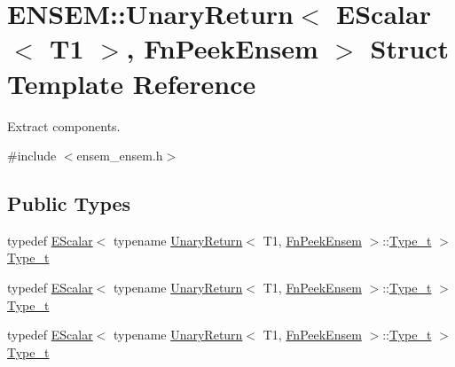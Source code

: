 \hypertarget{structENSEM_1_1UnaryReturn_3_01EScalar_3_01T1_01_4_00_01FnPeekEnsem_01_4}{}\section{E\+N\+S\+EM\+:\+:Unary\+Return$<$ E\+Scalar$<$ T1 $>$, Fn\+Peek\+Ensem $>$ Struct Template Reference}
\label{structENSEM_1_1UnaryReturn_3_01EScalar_3_01T1_01_4_00_01FnPeekEnsem_01_4}


Extract components.  




{\ttfamily \#include $<$ensem\+\_\+ensem.\+h$>$}

\subsection*{Public Types}
\begin{DoxyCompactItemize}
\item 
typedef \mbox{\hyperlink{classENSEM_1_1EScalar}{E\+Scalar}}$<$ typename \mbox{\hyperlink{structENSEM_1_1UnaryReturn}{Unary\+Return}}$<$ T1, \mbox{\hyperlink{structENSEM_1_1FnPeekEnsem}{Fn\+Peek\+Ensem}} $>$\+::\mbox{\hyperlink{structENSEM_1_1UnaryReturn_3_01EScalar_3_01T1_01_4_00_01FnPeekEnsem_01_4_a6043117f7e0aff65d845b3da0fb24d01}{Type\+\_\+t}} $>$ \mbox{\hyperlink{structENSEM_1_1UnaryReturn_3_01EScalar_3_01T1_01_4_00_01FnPeekEnsem_01_4_a6043117f7e0aff65d845b3da0fb24d01}{Type\+\_\+t}}
\item 
typedef \mbox{\hyperlink{classENSEM_1_1EScalar}{E\+Scalar}}$<$ typename \mbox{\hyperlink{structENSEM_1_1UnaryReturn}{Unary\+Return}}$<$ T1, \mbox{\hyperlink{structENSEM_1_1FnPeekEnsem}{Fn\+Peek\+Ensem}} $>$\+::\mbox{\hyperlink{structENSEM_1_1UnaryReturn_3_01EScalar_3_01T1_01_4_00_01FnPeekEnsem_01_4_a6043117f7e0aff65d845b3da0fb24d01}{Type\+\_\+t}} $>$ \mbox{\hyperlink{structENSEM_1_1UnaryReturn_3_01EScalar_3_01T1_01_4_00_01FnPeekEnsem_01_4_a6043117f7e0aff65d845b3da0fb24d01}{Type\+\_\+t}}
\item 
typedef \mbox{\hyperlink{classENSEM_1_1EScalar}{E\+Scalar}}$<$ typename \mbox{\hyperlink{structENSEM_1_1UnaryReturn}{Unary\+Return}}$<$ T1, \mbox{\hyperlink{structENSEM_1_1FnPeekEnsem}{Fn\+Peek\+Ensem}} $>$\+::\mbox{\hyperlink{structENSEM_1_1UnaryReturn_3_01EScalar_3_01T1_01_4_00_01FnPeekEnsem_01_4_a6043117f7e0aff65d845b3da0fb24d01}{Type\+\_\+t}} $>$ \mbox{\hyperlink{structENSEM_1_1UnaryReturn_3_01EScalar_3_01T1_01_4_00_01FnPeekEnsem_01_4_a6043117f7e0aff65d845b3da0fb24d01}{Type\+\_\+t}}
\end{DoxyCompactItemize}


